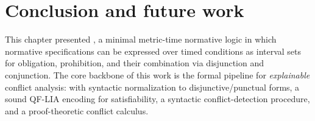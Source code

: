 


\section{Conclusion and future work}
This chapter presented \TDDLfm, a minimal metric-time normative logic in which normative specifications can be expressed over timed conditions as interval sets for obligation, prohibition, and their combination via disjunction and conjunction. The core backbone of this work is the formal pipeline for \emph{explainable} conflict analysis: with syntactic normalization to disjunctive/punctual forms, a sound QF-LIA encoding for satisfiability, a syntactic conflict-detection procedure, and a proof-theoretic conflict calculus. 



